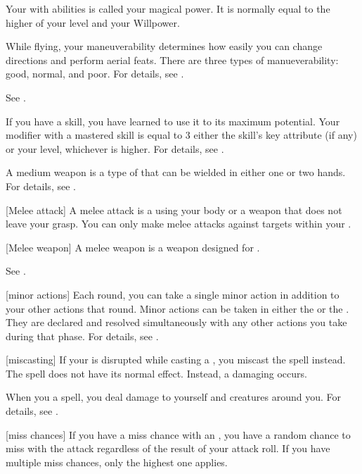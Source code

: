  Your  with  abilities is called your magical power.
It is normally equal to the higher of your level and your Willpower.

 While flying, your maneuverability determines how easily you can change directions and perform aerial feats.
There are three types of manueverability: good, normal, and poor.
For details, see .

 See .

 If you have  a skill, you have learned to use it to its maximum potential.
Your modifier with a mastered skill is equal to 3 \add either the skill's key attribute (if any) or your level, whichever is higher.
For details, see .

 A medium weapon is a type of  that can be wielded in either one or two hands.
For details, see .

[Melee attack] A melee attack is a  using your body or a weapon that does not leave your grasp.
You can only make melee attacks against targets within your .

[Melee weapon] A melee weapon is a weapon designed for .

 See .

[minor actions] Each round, you can take a single minor action in addition to your other actions that round.
Minor actions can be taken in either the  or the .
They are declared and resolved simultaneously with any other actions you take during that phase.
For details, see .

[miscasting] If your  is disrupted while casting a , you miscast the spell instead.
The spell does not have its normal effect.
Instead, a damaging  occurs.

 When you  a spell, you deal damage to yourself and creatures around you.
For details, see .

[miss chances] If you have a miss chance with an , you have a random chance to miss with the attack regardless of the result of your attack roll.
If you have multiple miss chances, only the highest one applies.

